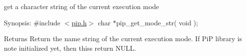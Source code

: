 get a character string of the current execution mode

\begin{DoxyParagraph}{Synopsis\-:}
\#include $<$\hyperlink{pip_8h_source}{pip.\-h}$>$ char $\ast$pip\-\_\-get\-\_\-mode\-\_\-str( void );
\end{DoxyParagraph}
\begin{DoxyReturn}{Returns}
Return the name string of the current execution mode. If Pi\-P library is note initialized yet, then thiss return {\ttfamily N\-U\-L\-L}. 
\end{DoxyReturn}
